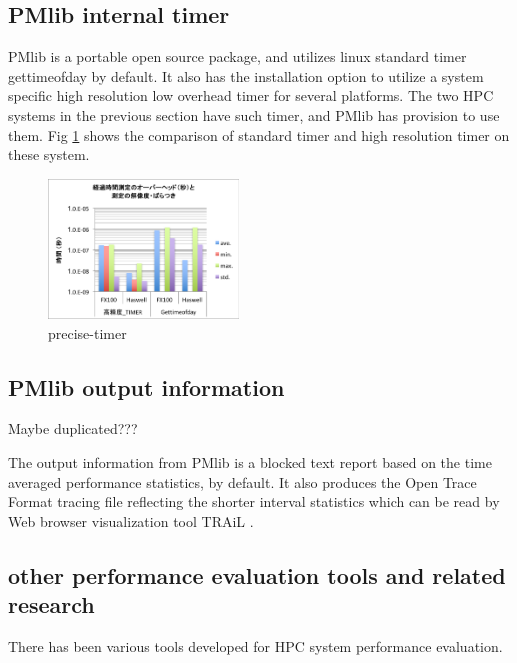 \documentclass[conference]{IEEEtran}
\begin{document}





\subsection{PMlib internal timer}
PMlib is a portable open source package, and utilizes linux standard timer
gettimeofday by default. It also has the installation option to utilize
a system specific high resolution low overhead timer for several platforms.
The two HPC systems in the previous section have such timer, and PMlib has
provision to use them.
Fig \ref{fig:precise-timer} shows the comparison of standard timer and
high resolution timer on these system.


\begin{figure}[bt]
\centering
\includegraphics[width=0.45\textwidth]{figs/precise-timer.pdf}
\caption{precise-timer}
\label{fig:precise-timer}
\end{figure}



\subsection{PMlib output information}

{\color{blue} Maybe duplicated???}

The output information from PMlib is a blocked text report based on
the time averaged performance statistics, by default.
It also produces the Open Trace Format \cite{} tracing file reflecting
the shorter interval statistics which can be read by Web browser
visualization tool TRAiL \cite{}.


\subsection{other performance evaluation tools and related research}

There has been various tools developed for HPC system  performance evaluation.
\end{document}
